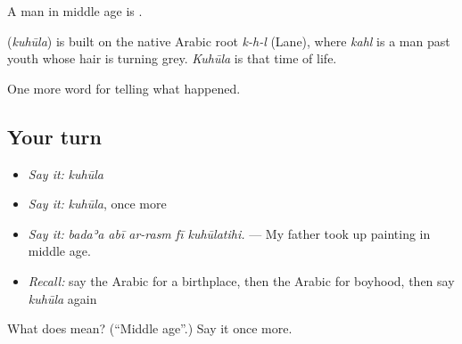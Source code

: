A man in middle age is .

\begin{cousinweb}
\textbf{} (\emph{kuhūla}) is built on the native Arabic root \emph{k-h-l} (Lane), where \emph{kahl} is a man past youth whose hair is turning grey. \emph{Kuhūla} is that time of life.
\end{cousinweb}

\begin{grammarlens}[title={What you've built}]
One more word for telling what happened.
\end{grammarlens}

\subsection*{Your turn}
\begin{itemize}
\raggedright
  \item \emph{Say it:} \emph{kuhūla}
  \item \emph{Say it:} \emph{kuhūla}, once more
  \item \emph{Say it:} \emph{badaʾa abī ar-rasm fī kuhūlatihi.} — My father took up painting in middle age.
  \item \emph{Recall:} say the Arabic for a birthplace, then the Arabic for boyhood, then say \emph{kuhūla} again
\end{itemize}

\begin{tcolorbox}[breakable,colback=teal!4,colframe=teal!35!black,title={Before you move on}]
What does  mean? (\textquotedblleft{}Middle age\textquotedblright{}.) Say it once more.
\end{tcolorbox}
